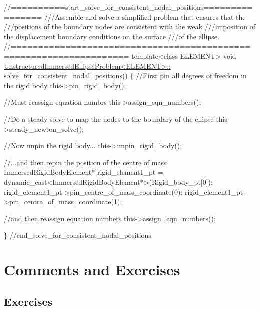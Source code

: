 \begin{DoxyCodeInclude}
\textcolor{comment}{//==========start\_solve\_for\_consistent\_nodal\_positions================}
\textcolor{comment}{///Assemble and solve a simplified problem that ensures that the }
\textcolor{comment}{}\textcolor{comment}{///positions of the boundary nodes are consistent with the weak }
\textcolor{comment}{}\textcolor{comment}{///imposition of the displacement boundary conditions on the surface}
\textcolor{comment}{}\textcolor{comment}{///of the ellipse.}
\textcolor{comment}{}\textcolor{comment}{//===================================================================}
\textcolor{keyword}{template}<\textcolor{keyword}{class} ELEMENT>
\textcolor{keywordtype}{void} \hyperlink{classUnstructuredImmersedEllipseProblem_a2a88b40ff1988de0fc696f1eb755ea54}{UnstructuredImmersedEllipseProblem<ELEMENT>::}
\hyperlink{classUnstructuredImmersedEllipseProblem_a2a88b40ff1988de0fc696f1eb755ea54}{solve\_for\_consistent\_nodal\_positions}()
\{
 \textcolor{comment}{//First pin all degrees of freedom in the rigid body}
 this->pin\_rigid\_body();

 \textcolor{comment}{//Must reassign equation numbrs}
 this->assign\_eqn\_numbers();

 \textcolor{comment}{//Do a steady solve to map the nodes to the boundary of the ellipse}
 this->steady\_newton\_solve();

 \textcolor{comment}{//Now unpin the rigid body...}
 this->unpin\_rigid\_body();

 \textcolor{comment}{//...and then repin the position of the centre of mass}
 ImmersedRigidBodyElement* rigid\_element1\_pt = 
  \textcolor{keyword}{dynamic\_cast<}ImmersedRigidBodyElement*\textcolor{keyword}{>}(Rigid\_body\_pt[0]);
 rigid\_element1\_pt->pin\_centre\_of\_mass\_coordinate(0);
 rigid\_element1\_pt->pin\_centre\_of\_mass\_coordinate(1);

 \textcolor{comment}{//and then reassign equation numbers}
 this->assign\_eqn\_numbers();

\} \textcolor{comment}{//end\_solve\_for\_consistent\_nodal\_positions}

\end{DoxyCodeInclude}




 

\hypertarget{index_comments}{}\section{Comments and Exercises}\label{index_comments}
\hypertarget{index_exercises}{}\subsection{Exercises}\label{index_exercises}


